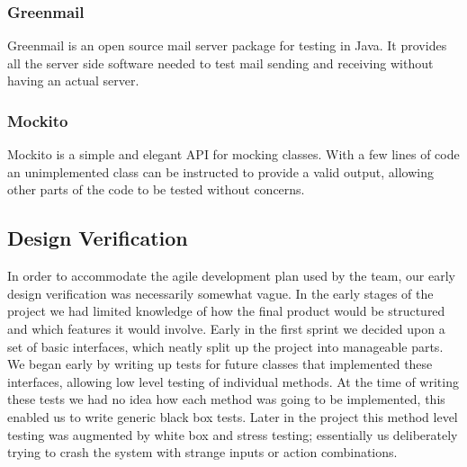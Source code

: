 \subsubsection{Greenmail}
Greenmail is an open source mail server package for testing in Java. It provides all the server side software needed to test mail sending and receiving without having an actual server.


\subsubsection{Mockito}
Mockito is a simple and elegant API for mocking classes. With a few lines of code an unimplemented class can be instructed to provide a valid output, allowing other parts of the code to be tested without concerns.

\subsection{Design Verification}
In order to accommodate the agile development plan used by the team, our early design verification was necessarily somewhat vague. In the early stages of the project we had limited knowledge of how the final product would be structured and which features it would involve.
\newline
\newline
Early in the first sprint we decided upon a set of basic interfaces, which neatly split up the project into manageable parts. We began early by writing up tests for future classes that implemented these interfaces, allowing low level testing of individual methods. At the time of writing these tests we had no idea how each method was going to be implemented, this enabled us to write generic black box tests.
\newline
\newline
Later in the project this method level testing was augmented by white box and stress testing; essentially us deliberately trying to crash the system with strange inputs or action combinations. 

